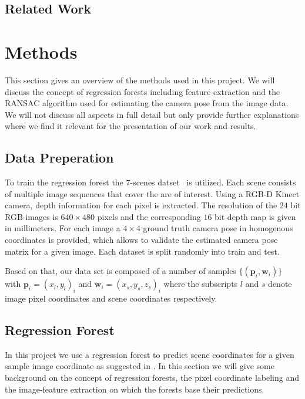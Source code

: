 \documentclass[final]{cvpr}
\begin{document}
\subsection{Related Work}


\section{Methods}
This section gives an overview of the methods used in this project. We will discuss
the concept of regression forests including feature extraction and the RANSAC algorithm
used for estimating the camera pose from the image data. We will not discuss all aspects
in full detail but only provide further explanations where we find it relevant
for the presentation of our work and results.

\subsection{Data Preperation}
To train the regression forest the 7-scenes datset~\cite{glocker2013} is utilized. 
Each scene consists of multiple image sequences that cover the are of interest. Using a RGB-D 
Kinect camera, depth information for each pixel is extracted. The resolution of the $24$ 
bit RGB-images is $640\times480$ pixels and the corresponding $16$ bit depth map is given 
in millimeters. For each image a $4\times4$ ground truth camera pose in homogenous coordinates 
is provided, which allows to validate the estimated camera pose matrix for a given image. 
Each dataset is split randomly into train and test. 

Based on that, our data set is composed of a number of samples $\{(\boldsymbol{p}_i, \boldsymbol{w}_i)\}$ with
$\boldsymbol{p}_i = (x_l, y_l)_i$ and $\boldsymbol{w}_i = (x_s, y_s, z_s)_i$ where the subscripts
$l$ and $s$ denote image pixel coordinates and scene coordinates respectively.\\

\subsection{Regression Forest}

In this project we use a regression forest to predict scene coordinates for a given
sample image coordinate as suggested in \cite{shotton2013}. In this section we will
give some background on the concept of regression forests, the pixel coordinate
labeling and the image-feature extraction on which the forests base their predictions.\\
\end{document}
